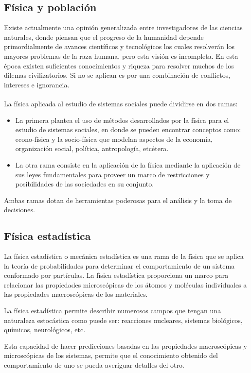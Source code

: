 \subsection*{Física y población}
Existe actualmente una opinión generalizada entre investigadores de las ciencias naturales, donde piensan que el progreso de la humanidad depende primordialmente de avances científicos y tecnológicos los cuales resolverán los mayores problemas de la raza humana, pero esta visión es incompleta. En esta época existen suficientes conocimientos y riqueza para resolver muchos de los dilemas civilizatorios. Si no se aplican es por una combinación de conflictos, intereses e ignorancia. \cite{OctavioMiramontes2013}
\\
\\
La física aplicada al estudio de sistemas sociales puede dividirse en dos ramas: 
\begin{itemize}
    \item La primera plantea el uso de métodos desarrollados por la física para el estudio de sistemas sociales, en donde se pueden encontrar conceptos como: econo-física y la socio-física que modelan aspectos de la economía, organización social, política, antropología, etcétera.
    \item La otra rama consiste en la aplicación de la física mediante la aplicación de sus leyes fundamentales para proveer un marco de restricciones y posibilidades de las sociedades en su conjunto.
\end{itemize}
Ambas ramas dotan de herramientas poderosas para el análisis y la toma de decisiones. \cite{OctavioMiramontes2013}

\subsection*{Física estadística}
La física estadística o mecánica estadística es una rama de la física que se aplica la teoría de probabilidades para determinar el comportamiento de un sistema conformado por partículas. La física estadística proporciona un marco para relacionar las propiedades microscópicas de los átomos y moléculas individuales a las propiedades macroscópicas de los materiales. \cite{Rodriguez2021}

La física estadística permite describir numerosos campos que tengan una naturaleza estocástica como puede ser: reacciones nucleares, sistemas biológicos, químicos, neurológicos, etc.

Esta capacidad de hacer predicciones basadas en las propiedades macroscópicas y microscópicas de los sistemas, permite que el conocimiento obtenido del comportamiento de uno se pueda averiguar detalles del otro.

